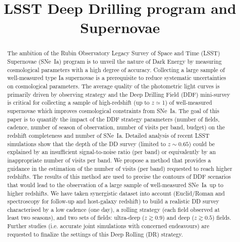 \documentclass[skiphelvet,twocolumn]{aastex63}
\newcommand{\sne}{{SNe~Ia}}
\begin{document}
\title{LSST Deep Drilling program and Supernovae}



\maketitlepre

\begin{abstract}
  
  The ambition of the Rubin Observatory Legacy Survey of Space and Time (LSST) Supernovae (\sne) program is to unveil the nature of Dark Energy by measuring cosmological parameters with a high degree of accuracy. Collecting a large sample of well-measured type Ia supernovae is a prerequisite to reduce systematic uncertainties on cosmological parameters. The average quality of the photometric light curves is primarily driven by observing strategy %
and the Deep Drilling Field (DDF) mini-survey is critical for collecting a sample of high-redshift (up to $z\simeq$1) of well-measured supernovae which improves cosmological constraints from \sne. The goal of this paper is to quantify the impact of the DDF strategy parameters (number of fields, cadence, number of season of observation, number of visits per band, budget) on the redshift completeness and number of \sne. Detailed analysis of recent LSST simulations show that the depth of the DD survey (limited to $z\sim0.65$) could be explained by an insufficient signal-to-noise ratio (per band) or equivalently by an inappropriate number of visits per band. We propose a method that provides a guidance in the estimation of the number of visits (per band) requested to reach higher redshifts. The results of this method are used to precise the contours of DDF scenarios that would lead to the observation of a large sample of well-measured \sne~up to higher redshifts. We have taken synergistic dataset into account (Euclid/Roman and spectroscopy for follow-up and host-galaxy redshift) to build a realistic DD survey characterised by a low cadence (one day), a rolling strategy (each field observed at least two seasons), and two sets of fields: ultra-deep ($z\gtrsim0.9$) and deep ($z\gtrsim0.5$) fields. Further studies (i.e. accurate joint simulations with concerned endeavours) are requested to finalize the settings of this Deep Rolling (DR) strategy.

\end{abstract}

\end{document}
